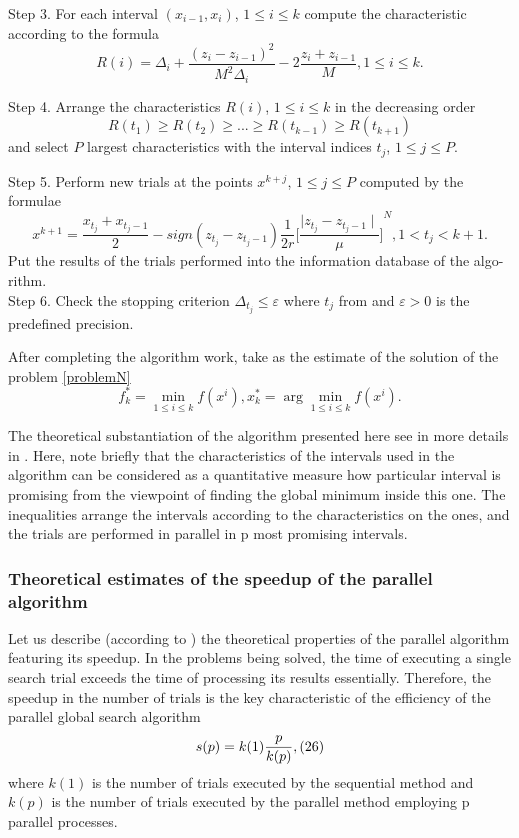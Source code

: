 \documentclass[runningheads]{llncs}
\begin{document}
Step 3. For each interval $(x_{i-1}, x_i)$, $1 \leq i \leq k$ compute the characteristic according to the formula
$$ R(i) = \Delta_i + \frac{(z_i - z_{i-1})^2}{M^2 \Delta_i} - 2 \frac{z_i + z_{i-1}}{M}, 1 \leq i \leq k. $$ 

Step 4. Arrange the characteristics $R(i)$, $1 \leq i \leq k$ in the decreasing order
$$ R(t_1) \geq R(t_2) \geq ... \geq R(t_{k-1}) \geq R(t_{k+1}) $$
and select $P$ largest characteristics with the interval indices $t_j$, $1 \leq j \leq P$.

Step 5. Perform new trials at the points $x^{k+j}$, $1 \leq j \leq P$ computed by the formulae
$$ x^{k+1} = \frac{x_{t_j} + x_{t_j - 1}}{2} - sign(z_{t_j} - z_{t_j - 1}) \frac{1}{2r} {\Bigg[\frac{\mid z_{t_j} - z_{t_j - 1} \mid}{\mu}\Bigg]}^{N}, 1 < t_j < k+1.$$
Put the results of the trials performed into the information database of the algo-rithm.\\

Step 6. Check the stopping criterion $\Delta_{t_j} \leq \varepsilon$ where $t_j$ from \cite{} and $\varepsilon > 0$ is the predefined precision. 

After completing the algorithm work, take as the estimate of the solution of the problem \ref{problemN} 
$$ f_k^* = \min\limits_{1 \leq i \leq k} f(x^i), x_k^* = \arg \min\limits_{1 \leq i \leq k} f(x^i).$$

The theoretical substantiation of the algorithm presented here see in more details in \cite{}. Here, note briefly that the characteristics of the intervals used in the algorithm \cite{} can be considered as a quantitative measure how particular interval is promising from the viewpoint of finding the global minimum inside this one. The inequalities \cite{} arrange the intervals according to the characteristics on the ones, and the trials are performed in parallel in p most promising intervals.

\subsubsection{Theoretical estimates of the speedup of the parallel algorithm}
Let us describe (according to \cite{}) the theoretical properties of the parallel algorithm featuring its speedup. In the problems being solved, the time of executing a single search trial exceeds the time of processing its results essentially. Therefore, the speedup in the number of trials is the key characteristic of the efficiency of the parallel global search algorithm
$$s(p) = k(1)\frac{p}{k(p)}, \eqno(26)$$
where $k(1)$ is the number of trials executed by the sequential method and $k(p)$ is the number of trials executed by the parallel method employing p parallel processes.\\
\end{document}
